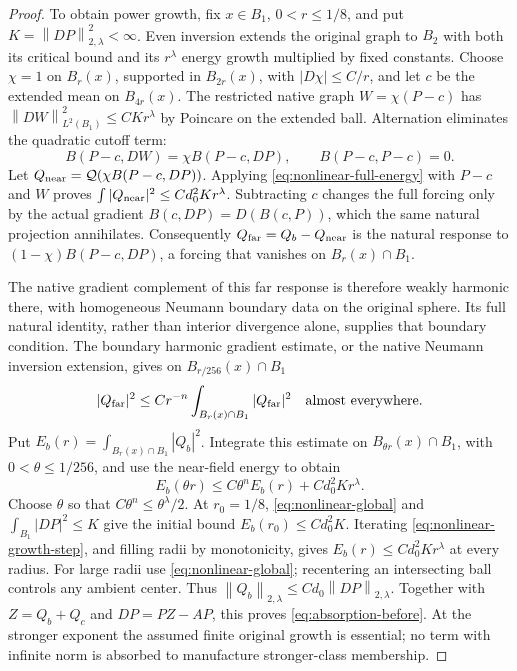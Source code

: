 \documentclass[11pt,a4paper]{article}
\numberwithin{equation}{section}
\theoremstyle{definition}
\theoremstyle{remark}
\newcommand{\norm}[1]{\left\lVert#1\right\rVert}
\begin{document}
\begin{proof}
To obtain power growth, fix $x\in B_1$, $0<r\leq1/8$, and put
$K=\norm{DP}_{2,\lambda}^2<\infty$. Even inversion extends the
original graph to $B_2$ with both its critical bound and its
$r^\lambda$ energy growth multiplied by fixed constants. Choose
$\chi=1$ on $B_r(x)$, supported in $B_{2r}(x)$, with
$|D\chi|\leq C/r$, and let $c$ be the extended mean on $B_{4r}(x)$.
The restricted native graph $W=\chi(P-c)$ has
$\norm{DW}_{L^2(B_1)}^2\leq CKr^\lambda$ by Poincare on the extended
ball. Alternation eliminates the quadratic cutoff term:
\[
 B(P-c,DW)=\chi B(P-c,DP),\qquad B(P-c,P-c)=0.
\]
Let $Q_{\rm near}=\mathcal Q(\chi B(P-c,DP))$. Applying
\eqref{eq:nonlinear-full-energy} with $P-c$ and $W$ proves
$\int|Q_{\rm near}|^2\leq Cd_0^2Kr^\lambda$.
Subtracting $c$ changes the full forcing only by the actual gradient
$B(c,DP)=D(B(c,P))$, which the same natural projection annihilates.
Consequently $Q_{\rm far}=Q_b-Q_{\rm near}$ is the natural response to
$(1-\chi)B(P-c,DP)$, a forcing that vanishes on $B_r(x)\cap B_1$.

The native gradient complement of this far response is therefore
weakly harmonic there, with homogeneous Neumann boundary data on the
original sphere. Its full natural identity, rather than interior
divergence alone, supplies that boundary condition. The boundary
harmonic gradient estimate, or the native Neumann inversion extension,
gives on $B_{r/256}(x)\cap B_1$
\[
 |Q_{\rm far}|^2\leq Cr^{-n}
      \int_{B_r(x)\cap B_1}|Q_{\rm far}|^2
 \quad\text{almost everywhere}.
\]
Put $E_b(r)=\int_{B_r(x)\cap B_1}|Q_b|^2$. Integrate this estimate
on $B_{\theta r}(x)\cap B_1$, with $0<\theta\leq1/256$, and use
the near-field energy to obtain
\begin{equation}\label{eq:nonlinear-growth-step}
 E_b(\theta r)\leq C\theta^nE_b(r)+Cd_0^2Kr^\lambda.
\end{equation}
Choose $\theta$ so that $C\theta^n\leq\theta^\lambda/2$.
At $r_0=1/8$, \eqref{eq:nonlinear-global} and
$\int_{B_1}|DP|^2\leq K$ give the initial bound
$E_b(r_0)\leq Cd_0^2K$. Iterating
\eqref{eq:nonlinear-growth-step}, and filling radii by monotonicity,
gives $E_b(r)\leq Cd_0^2Kr^\lambda$ at every radius. For large radii
use \eqref{eq:nonlinear-global}; recentering an intersecting ball
controls any ambient center. Thus
$\norm{Q_b}_{2,\lambda}\leq Cd_0\norm{DP}_{2,\lambda}$.
Together with $Z=Q_b+Q_c$ and $DP=PZ-AP$, this proves
\eqref{eq:absorption-before}. At the stronger exponent the assumed
finite original growth is essential; no term with infinite norm is
absorbed to manufacture stronger-class membership.


\end{proof}
\end{document}
